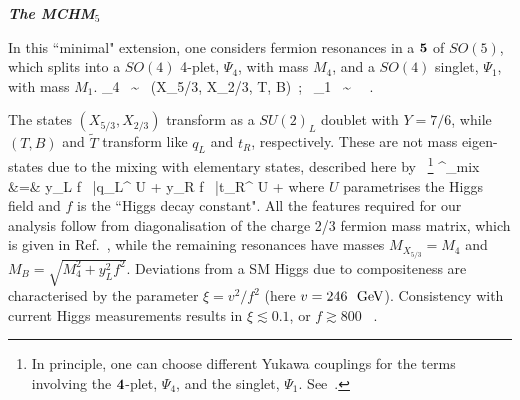 \medskip
\noindent
\textit{\small \bf The MCHM$_5$}
\medskip

In this ``minimal" extension, one considers fermion resonances in a 
${\bf 5}$ of $SO(5)$, which splits into a $SO(4)$ 4-plet,
$\Psi_4$, with mass $M_4$, and a $SO(4)$ singlet, $\Psi_1$, with mass $M_1$.
%
\be
\Psi_4 ~\sim~ (X_{5/3}, X_{2/3}, T, B)~;~   \Psi_1 ~\sim~ ~.
\label{comp5content}
\ee
%

 The states $(X_{5/3}, X_{2/3})$ transform as a $SU(2)_L$ doublet with $Y = 7/6$, while $(T, B)$ and $\tilde{T}$ transform like $q_L$ and $t_R$, respectively. These are not mass eigen-states due to the mixing with elementary states, described here by ~\footnote{In principle, one can
choose different Yukawa couplings for the terms involving the ${\bf 4}$-plet, $\Psi_4$, and the singlet, $\Psi_1$.
See~\cite{MCHMtthh}.}
%
%
%
\bea
{}^{}_{\rm mix} &=&
y_L f \, \bar{q}_L^{} U  
+ y_R f \, \bar{t}_R^{} U  + 
\label{Lmix5}
\eea
%
where $U$ parametrises the Higgs field and $f$ is the ``Higgs decay
constant".  All the features required for our analysis follow from diagonalisation of the charge 2/3 fermion mass matrix, which is given in Ref.~\cite{MCHMtthh}, while the
 remaining resonances have masses $M_{X_{5/3}} = M_4$ and $M_B =
\sqrt{M_4^2 + y_{L}^2 f^2}$. Deviations from a SM Higgs due to compositeness are characterised by the parameter $\xi = v^2/f^2$ (here $v = 246~{\rm ~\text{GeV}}$). Consistency with current
Higgs measurements results in $\xi\lesssim 0.1$, or $f \gtrsim 800$
\UGeV~\cite{Falkowski:2013dza, Carena:2014ria, Buchalla:2014eca,
Sanz:2017tco, Liu:2017dsz, Banerjee:2017wmg, deBlas:2018tjm}.  

